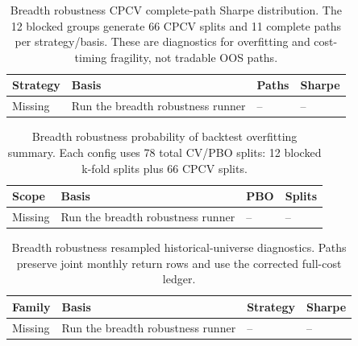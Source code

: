 \begin{table}[H]
\centering
\scriptsize
{}
  {\resizebox{\textwidth}{!}{}}
  {\begin{tabular}{llll}\toprule Strategy & Basis & Paths & Sharpe \\\midrule Missing & Run the breadth robustness runner & -- & -- \\\bottomrule\end{tabular}}
\caption{Breadth robustness CPCV complete-path Sharpe distribution. The 12 blocked
groups generate 66 CPCV splits and 11 complete paths per strategy/basis. These are
diagnostics for overfitting and cost-timing fragility, not tradable OOS paths.}
\label{tab:breadth_robustness_cpcv_app}
\end{table}

\begin{table}[H]
\centering
\scriptsize
{}
  {\resizebox{\textwidth}{!}{}}
  {\begin{tabular}{llll}\toprule Scope & Basis & PBO & Splits \\\midrule Missing & Run the breadth robustness runner & -- & -- \\\bottomrule\end{tabular}}
\caption{Breadth robustness probability of backtest overfitting summary. Each config uses
78 total CV/PBO splits: 12 blocked k-fold splits plus 66 CPCV splits.}
\label{tab:breadth_robustness_pbo_app}
\end{table}

\begin{table}[H]
\centering
\scriptsize
{}
  {\resizebox{\textwidth}{!}{}}
  {\begin{tabular}{llll}\toprule Family & Basis & Strategy & Sharpe \\\midrule Missing & Run the breadth robustness runner & -- & -- \\\bottomrule\end{tabular}}
\caption{Breadth robustness resampled historical-universe diagnostics. Paths preserve
joint monthly return rows and use the corrected full-cost ledger.}
\label{tab:breadth_robustness_mc_resampled_app}
\end{table}


